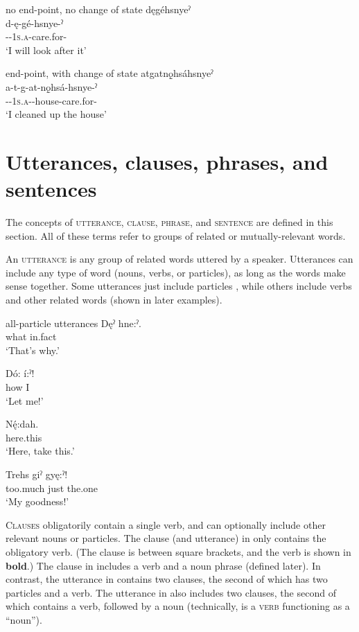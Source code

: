 \ea\label{ex:aktionex5} no end-point, no change of state
\ea dęgéhsnyeˀ\\
\gll d-ę-gé-hsnye-ˀ\\
{\dualic}-{\future}-\textsc{1s.a}-care.for-{\punctual}\\
\glt ‘I will look after it’
\z
\z

\ea\label{ex:aktionex4} end-point, with change of state
\ea atgatnǫ̱hsáhsnyeˀ\\
\gll a-t-g-at-nǫ̱hsá-hsnye-ˀ\\
{\factual}-{\dualic}-\textsc{1s.a}-{\semireflexive}-house-care.for-{\punctual}\\
\glt ‘I cleaned up the house’ 
\z
\z 



\section{Utterances, clauses, phrases, and sentences} \label{Utterances, clauses, phrases, and sentences}
The concepts of \textsc{utterance}, \textsc{clause}, \textsc{phrase}, and \textsc{sentence} are defined in this section. All of these terms refer to groups of related or mutually-relevant words. 

An \textsc{utterance} is any group of related words uttered by a speaker. Utterances can include any type of word (nouns, verbs, or particles), as long as the words make sense together. Some utterances just include particles , while others include verbs and other related words (shown in later examples). 

\ea\label{ex:sentencex5} all-particle utterances 
\ea 
\gll Dęˀ hne:ˀ.\\
what in.fact\\
\glt ‘That’s why.’

\ex
\gll Dó: í:ˀ!\\
how I\\
\glt ‘Let me!’

\ex
\gll Nę́:dah. \\
here.this\\
\glt ‘Here, take this.’

\ex
\gll Trehs giˀ gyę:ˀ! \\
too.much just the.one\\
\glt ‘My goodness!’
\z
\z 

\textsc{Clauses} obligatorily contain a single verb, and can optionally include other relevant nouns or particles. The clause (and utterance) in  only contains the obligatory verb. (The clause is between square brackets, and the verb is shown in \textbf{bold}.) The clause in  includes a verb and a noun phrase (defined later). In contrast, the utterance in  contains two clauses, the second of which has two particles and a verb. The utterance in  also includes two clauses, the second of which contains a verb, followed by a noun (technically,  is a \textsc{verb} functioning as a “noun”). 

